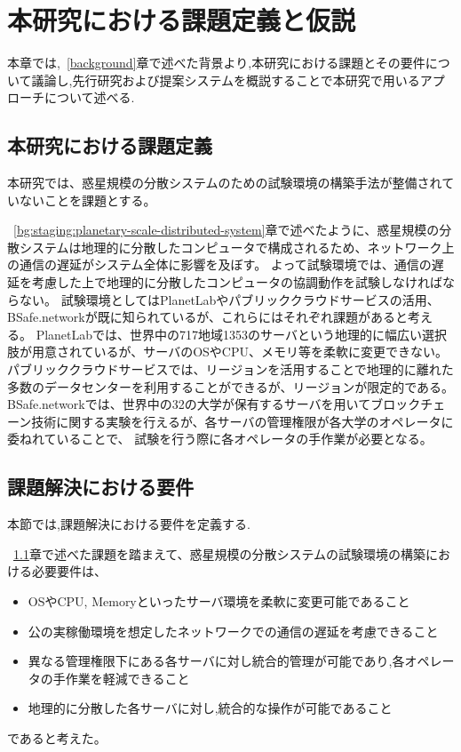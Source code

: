 \chapter{本研究における課題定義と仮説}
\label{issue}

本章では,~\ref{background}章で述べた背景より,本研究における課題とその要件について議論し,先行研究および提案システムを概説することで本研究で用いるアプローチについて述べる.

\section{本研究における課題定義}
\label{issue:definition}

本研究では、惑星規模の分散システムのための試験環境の構築手法が整備されていないことを課題とする。

~\ref{bg:staging:planetary-scale-distributed-system}章で述べたように、惑星規模の分散システムは地理的に分散したコンピュータで構成されるため、ネットワーク上の通信の遅延がシステム全体に影響を及ぼす。
よって試験環境では、通信の遅延を考慮した上で地理的に分散したコンピュータの協調動作を試験しなければならない。
試験環境としてはPlanetLabやパブリッククラウドサービスの活用、BSafe.networkが既に知られているが、これらにはそれぞれ課題があると考える。
PlanetLabでは、世界中の717地域1353のサーバという地理的に幅広い選択肢が用意されているが、サーバのOSやCPU、メモリ等を柔軟に変更できない。
パブリッククラウドサービスでは、リージョンを活用することで地理的に離れた多数のデータセンターを利用することができるが、リージョンが限定的である。
BSafe.networkでは、世界中の32の大学が保有するサーバを用いてブロックチェーン技術に関する実験を行えるが、各サーバの管理権限が各大学のオペレータに委ねれていることで、
試験を行う際に各オペレータの手作業が必要となる。

\section{課題解決における要件}
\label{issue:requirements}

本節では,課題解決における要件を定義する.

~\ref{issue:definition}章で述べた課題を踏まえて、惑星規模の分散システムの試験環境の構築における必要要件は、
\begin{itemize}
  \item OSやCPU, Memoryといったサーバ環境を柔軟に変更可能であること
  \item 公の実稼働環境を想定したネットワークでの通信の遅延を考慮できること
  \item 異なる管理権限下にある各サーバに対し統合的管理が可能であり,各オペレータの手作業を軽減できること
  \item 地理的に分散した各サーバに対し,統合的な操作が可能であること
\end{itemize}
であると考えた。

